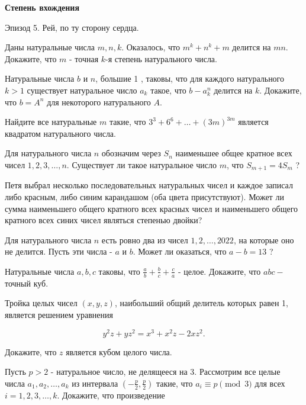 \centerline{\bf \Huge Степень вхождения}

\begin{flushright}
        \scriptsize{Эпизод 5. Рей, по ту сторону сердца.}
\end{flushright}

Даны натуральные числа $m, n, k$. Оказалось, что $m^k+n^k+m$ делится на $m n$. Докажите, что $m$ - точная $k$-я степень натурального числа.

Натуральные числа $b$ и $n$, большие 1 , таковы, что для каждого натурального $k>1$ существует натуральное число $a_k$ такое, что $b-a_k^n$ делится на $k$. Докажите, что $b=A^n$ для некоторого натурального $A$.

Найдите все натуральные $m$ такие, что $3^3+6^6+\ldots+(3 m)^{3 m}$ является квадратом натурального числа.

Для натурального числа $n$ обозначим через $S_n$ наименьшее общее кратное всех чисел $1,2,3, \ldots, n$. Существует ли такое натуральное число $m$, что $S_{m+1}=4 S_m$ ?

Петя выбрал несколько последовательных натуральных чисел и каждое записал либо красным, либо синим карандашом (оба цвета присутствуют). Может ли сумма наименьшего общего кратного всех красных чисел и наименьшего общего кратного всех синих чисел являться степенью двойки?

Для натурального числа $n$ есть ровно два из чисел $1,2, \ldots, 2022$, на которые оно не делится. Пусть эти числа - $a$ и $b$. Может ли оказаться, что $a-b=13$ ?

Натуральные числа $a, b, c$ таковы, что $\frac{a}{b}+\frac{b}{c}+\frac{c}{a}$ - целое. Докажите, что $a b c-$ точный куб.

Тройка целых чисел $(x, y, z)$, наибольший общий делитель которых равен 1, является решением уравнения

$$
y^2 z+y z^2=x^3+x^2 z-2 x z^2 .
$$


Докажите, что $z$ является кубом целого числа.


\newpage

\hspace{3mm}

Пусть $p>2$ - натуральное число, не делящееся на 3. Рассмотрим все целые числа $a_1, a_2, \ldots, a_k$ из интервала $\left(-\frac{p}{2}, \frac{p}{2}\right)$ такие, что $a_i \equiv p\pmod{3}$ для всех $i=1,2,3, \ldots, k$. Докажите, что произведение


